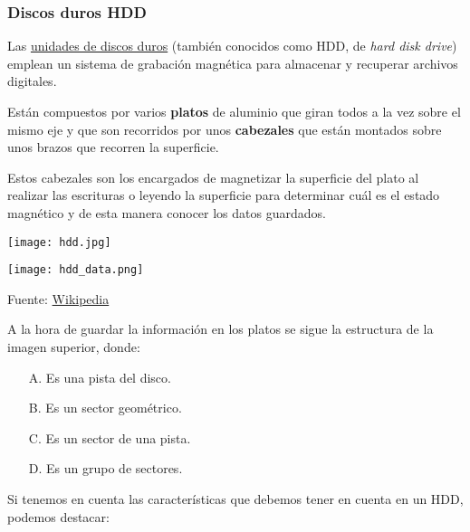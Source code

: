 \subsubsection{Discos duros HDD}

Las \href{https://es.wikipedia.org/wiki/Unidad_de_disco_duro}{unidades de discos duros} (también conocidos como HDD, de \textit{hard disk drive}) emplean un sistema de grabación magnética para almacenar y recuperar archivos digitales.

Están compuestos por varios \textbf{platos} de aluminio que giran todos a la vez sobre el mismo eje y que son recorridos por unos \textbf{cabezales} que están montados sobre unos brazos que recorren la superficie.

Estos cabezales son los encargados de magnetizar la superficie del plato al realizar las escrituras o leyendo la superficie para determinar cuál es el estado magnético y de esta manera conocer los datos guardados.

{
\begin{minipage}{0.57\linewidth}
        \texttt{[image: hdd.jpg]}
\end{minipage}
\hfill
\begin{minipage}{0.42\linewidth}
    \texttt{[image: hdd\_data.png]}
\end{minipage}
\vspace{-35pt}
\begin{center}
  Fuente: \href{https://es.wikipedia.org/wiki/Unidad_de_disco_duro}{Wikipedia}
\end{center}
}

A la hora de guardar la información en los platos se sigue la estructura de la imagen superior, donde:

\begin{enumerate}
    \item[A.] Es una pista del disco.
    \item[B.] Es un sector geométrico.
    \item[C.] Es un sector de una pista.
    \item[D.] Es un grupo de sectores.
\end{enumerate}


Si tenemos en cuenta las características que debemos tener en cuenta en un HDD, podemos destacar:

